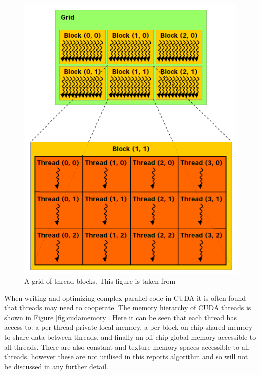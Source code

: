 \begin{figure}[p]
	\centering
		\includegraphics[scale=0.4]{images/cudathreads.PNG}
		\caption{A grid of thread blocks. This figure is taken from \cite{cuda}}
	\label{fig:cudathreads}
\end{figure}

When writing and optimizing complex parallel code in CUDA it is often found that threads may need to cooperate. The memory hierarchy of CUDA threads is shown in Figure \ref{fig:cudamemory}. Here it can be seen that each thread has access to: a per-thread private local memory, a per-block on-chip shared memory to share data between threads, and finally an off-chip global memory accessible to all threads. There are also constant and texture memory spaces accessible to all threads, however these are not utilised in this reports algorithm and so will not be discussed in any further detail.

